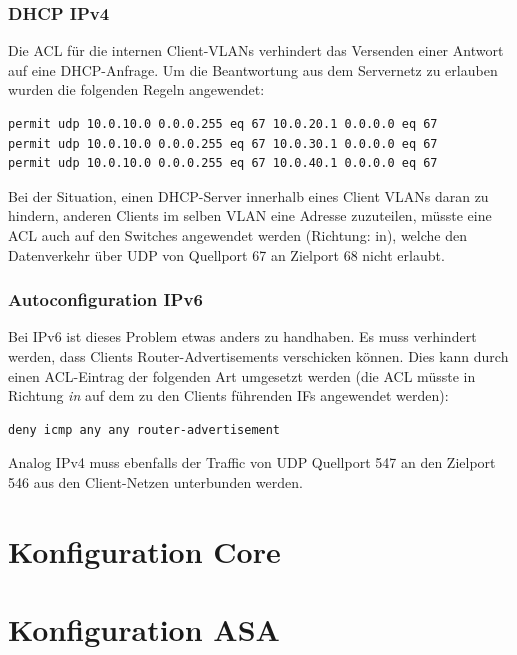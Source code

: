 \documentclass[11pt,a4paper,parskip=half]{scrartcl}
\begin{document}
\subsubsection{DHCP IPv4}
Die ACL für die internen Client-VLANs verhindert das Versenden einer Antwort auf eine DHCP-Anfrage. Um die Beantwortung aus dem Servernetz zu erlauben wurden die folgenden Regeln angewendet:

\begin{lstlisting}
permit udp 10.0.10.0 0.0.0.255 eq 67 10.0.20.1 0.0.0.0 eq 67
permit udp 10.0.10.0 0.0.0.255 eq 67 10.0.30.1 0.0.0.0 eq 67
permit udp 10.0.10.0 0.0.0.255 eq 67 10.0.40.1 0.0.0.0 eq 67
\end{lstlisting}

Bei der Situation, einen DHCP-Server innerhalb eines Client VLANs daran zu hindern, anderen Clients im selben VLAN eine Adresse zuzuteilen, müsste eine ACL auch auf den Switches angewendet werden (Richtung: in), welche den Datenverkehr über UDP von Quellport 67 an Zielport 68 nicht erlaubt.

\subsubsection{Autoconfiguration IPv6}
Bei IPv6 ist dieses Problem etwas anders zu handhaben. Es muss verhindert werden, dass Clients Router-Advertisements verschicken können. Dies kann durch einen ACL-Eintrag der folgenden Art umgesetzt werden (die ACL müsste in Richtung \emph{in} auf dem zu den Clients führenden IFs angewendet werden):

\begin{lstlisting}
deny icmp any any router-advertisement
\end{lstlisting}

Analog IPv4 muss ebenfalls der Traffic von UDP Quellport 547 an den Zielport 546 aus den Client-Netzen unterbunden werden.

\newpage
\appendix
{}
{}
\section{Konfiguration Core}


\section{Konfiguration ASA}

\end{document}
